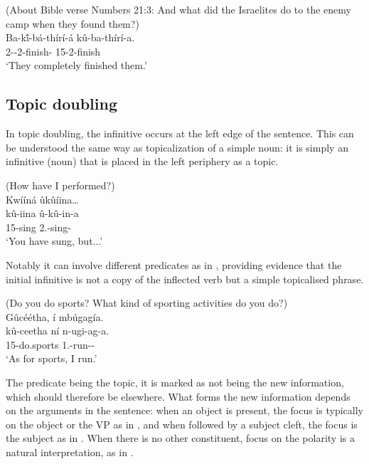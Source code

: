 \documentclass[output=paper]{langscibook}
\begin{document}
\z

\ea
\label{bkm:Ref118553738}
(About Bible verse Numbers 21:3: And what did the Israelites do to the enemy camp when they found them?)\\
\gll
Ba-k\'{î}-bá-thírí-á  kû-ba-thírí-a.\\
2\SM{}-\DEP{}-2\OM{}-finish-\FV{} 15-2\OM{}-finish\\
\glt
‘They completely finished them.’

\z

\subsection{Topic doubling}
\label{bkm:Ref115797355}
In topic doubling, the infinitive occurs at the left edge of the sentence. This can be understood the same way as topicalization of a simple noun: it is simply an infinitive (noun) that is placed in the left periphery as a topic.

\ea
(How have I performed?)\\
Kwííná ûkûíina…\\
\gll
kû-iina  û-kû-in-a\\
15-sing 2\SG.\SM{}-sing-\FV{}\\
\glt
‘You have sung, but...’

\z

Notably it can involve different predicates as in , providing evidence that the initial infinitive is not a copy of the inflected verb but a simple topicalised phrase.

\ea
\label{bkm:Ref115799130}
(Do you do sports? What kind of sporting activities do you do?)\\
Gûcéétha,  í  mbúgagía.\\
\gll
 kû-ceetha  ní  n-ugi-ag-a.\\
  15-do.sports \FOC{}  1\SG.\SM{}-run-\HAB-\FV{}\\
\glt
‘As for sports, I run.’

\z

The predicate being the topic, it is marked as not being the new information, which should therefore be elsewhere. What forms the new information depends on the arguments in the sentence: when an object is present, the focus is typically on the object or the VP as in , and when followed by a subject cleft, the focus is the subject as in . When there is no other constituent, focus on the polarity is a natural interpretation, as in .
\end{document}
